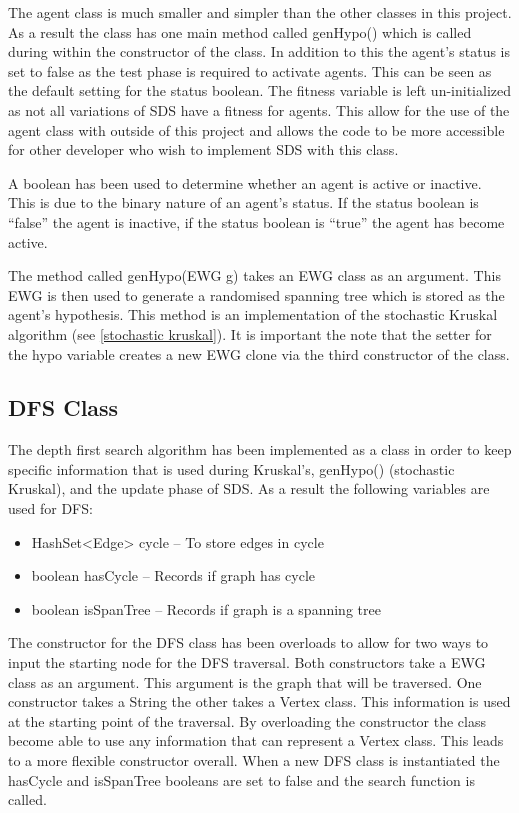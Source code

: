 \documentclass{AISB2008}
\begin{document}
The agent class is much smaller and simpler than the other classes in this project. As a result the class has one main method called genHypo() which is called during within the constructor of the class. In addition to this the agent’s status is set to false as the test phase is required to activate agents. This can be seen as the default setting for the status boolean. The fitness variable is left un-initialized as not all variations of SDS have a fitness for agents. This allow for the use of the agent class with outside of this project and allows the code to be more accessible for other developer who wish to implement SDS with this class.

A boolean has been used to determine whether an agent is active or inactive. This is due to the binary nature of an agent’s status. If the status boolean is “false” the agent is inactive, if the status boolean is “true” the agent has become active.

The method called genHypo(EWG g) takes an EWG class as an argument. This EWG is then used to generate a randomised spanning tree which is stored as the agent’s hypothesis. This method is an implementation of the stochastic Kruskal algorithm (see \ref{stochastic kruskal}).
It is important the note that the setter for the hypo variable creates a new EWG clone via the third constructor of the class.


\subsection{DFS Class}

The depth first search algorithm has been implemented as a class in order to keep specific information that is used during Kruskal’s, genHypo() (stochastic Kruskal), and the update phase of SDS. As a result the following variables are used for DFS:

\begin{itemize}
\item HashSet<Edge> cycle – To store edges in cycle
\item boolean hasCycle – Records if graph has cycle
\item boolean isSpanTree – Records if graph is a spanning tree 
\end{itemize}

The constructor for the DFS class has been overloads to allow for two ways to input the starting node for the DFS traversal. Both constructors take a EWG class as an argument. This argument is the graph that will be traversed. One constructor takes a String the other takes a Vertex class. This information is used at the starting point of the traversal. By overloading the constructor the class become able to use any information that can represent a Vertex class. This leads to a more flexible constructor overall. When a new DFS class is instantiated the hasCycle and isSpanTree booleans are set to false and the search function is called.
\end{document}
